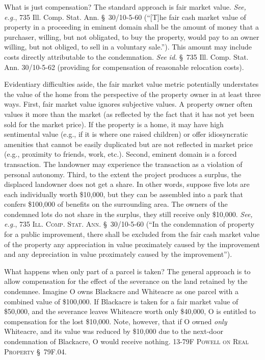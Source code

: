 What is just compensation? The standard approach is fair market value.
\textit{See, e.g.}, 735 Ill. Comp. Stat. Ann. \S~30/10-5-60 (``[T]he fair cash
market value of property in a proceeding in eminent domain shall be the amount
of money that a purchaser, willing, but not obligated, to buy the property,
would pay to an owner willing, but not obliged, to sell in a voluntary sale.'').
This amount may include costs directly attributable to the condemnation.
\textit{See id.} \S~735 Ill. Comp. Stat. Ann. 30/10-5-62 (providing for
compensation of reasonable relocation costs).

Evidentiary difficulties aside, the fair market value metric potentially
understates the value of the home from the perspective of the property owner in
at least three ways. First, fair market value ignores subjective values. A
property owner often values it more than the market (as reflected by the fact
that it has not yet been sold for the market price). If the property is a home,
it may have high sentimental value (e.g., if it is where one raised children) or
offer idiosyncratic amenities that cannot be easily duplicated but are not
reflected in market price (e.g., proximity to friends, work, etc.). Second,
eminent domain is a forced transaction. The landowner may experience the
transaction as a violation of personal autonomy. Third, to the extent the
project produces a surplus, the displaced landowner does not get a share. In
other words, suppose five lots are each individually worth \$10,000, but they
can be assembled into a park that confers \$100,000 of benefits on the
surrounding area. The owners of the condemned lots do not share in the surplus,
they still receive only \$10,000. \textit{See, e.g.}, 735 \textsc{Ill. Comp.
Stat. Ann.} \S~30/10-5-60 (``In the condemnation of property for a public
improvement, there shall be excluded from the fair cash market value of the
property any appreciation in value proximately caused by the improvement and any
depreciation in value proximately caused by the improvement'').

What happens when only part of a parcel is taken? The general approach is to
allow compensation for the effect of the severance on the land retained by the
condemnee. Imagine O owns Blackacre and Whiteacre as one parcel with a combined
value of \$100,000. If Blackacre is taken for a fair market value of \$50,000,
and the severance leaves Whiteacre worth only \$40,000, O is entitled to
compensation for the lost \$10,000. Note, however, that if O owned \textit{only}
Whiteacre, and its value was reduced by \$10,000 due to the next-door
condemnation of Blackacre, O would receive nothing. 13-79F \textsc{Powell on
Real Property} \S~79F.04. 

